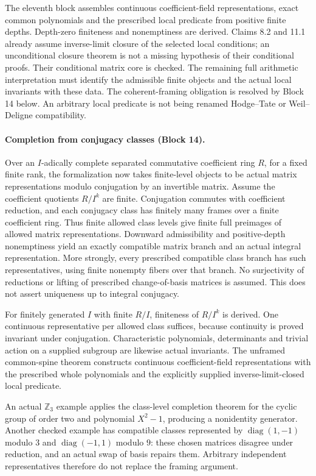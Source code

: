 \documentclass[11pt]{article}
\theoremstyle{definition}
\theoremstyle{remark}
\begin{document}
The eleventh block assembles continuous coefficient-field representations, exact
common polynomials and the prescribed local predicate from positive finite
depths. Depth-zero finiteness and nonemptiness are derived. Claims 8.2 and 11.1
already assume inverse-limit closure of the selected local conditions; an
unconditional closure theorem is not a missing hypothesis of their conditional
proofs. Their conditional matrix core is checked. The remaining full arithmetic
interpretation must identify the admissible finite objects and the actual local
invariants with these data. The coherent-framing obligation is resolved by Block 14
below. An arbitrary local
predicate is not being renamed Hodge--Tate or Weil--Deligne compatibility.


\paragraph{Completion from conjugacy classes (Block 14).}
Over an $I$-adically complete separated commutative coefficient ring $R$,
for a fixed finite rank, the formalization now takes finite-level objects to be
actual matrix representations modulo conjugation by an invertible matrix.
Assume the coefficient quotients $R/I^k$ are finite.
Conjugation commutes with coefficient reduction, and each conjugacy class has
finitely many frames over a finite coefficient ring. Thus finite allowed class
levels give finite full preimages of allowed matrix representations. Downward
admissibility and positive-depth nonemptiness yield an exactly compatible
matrix branch and an actual integral representation. More strongly, every
prescribed compatible class branch has such representatives, using finite
nonempty fibers over that branch. No surjectivity of reductions or lifting of
prescribed change-of-basis matrices is assumed. This does not assert uniqueness
up to integral conjugacy.

For finitely generated $I$ with finite $R/I$, finiteness of $R/I^k$ is derived.
One continuous representative per allowed class suffices, because continuity
is proved invariant under conjugation. Characteristic polynomials, determinants
and trivial action on a supplied subgroup are likewise actual invariants.
The unframed common-spine theorem constructs continuous coefficient-field
representations with the prescribed whole polynomials and the explicitly
supplied inverse-limit-closed local predicate.

An actual $\mathbb Z_3$ example applies the class-level completion theorem
for the cyclic group of order two and polynomial $X^2-1$, producing a nonidentity generator. Another
checked example has compatible classes represented by
$\operatorname{diag}(1,-1)$ modulo $3$ and
$\operatorname{diag}(-1,1)$ modulo $9$: these chosen matrices disagree under
reduction, and an actual swap of basis repairs them. Arbitrary independent
representatives therefore do not replace the framing argument.
\end{document}
